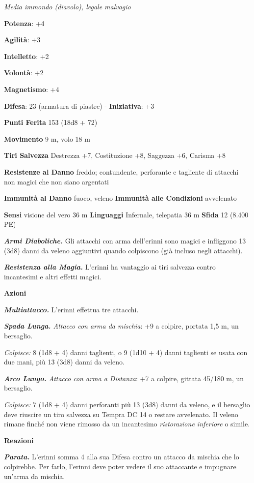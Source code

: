 \begin{multicols}{2}
\emph{Media immondo (diavolo), legale malvagio}

\textbf{Potenza}: +4

\textbf{Agilità}: +3

\textbf{Intelletto}: +2

\textbf{Volontà}: +2

\textbf{Magnetismo}: +4

\textbf{Difesa}: 23 (armatura di piastre) - \textbf{Iniziativa}: +3

\textbf{Punti Ferita} 153 (18d8 + 72)

\textbf{Movimento} 9 m, volo 18 m

\textbf{Tiri Salvezza} Destrezza +7, Costituzione +8, Saggezza +6,
Carisma +8

\textbf{Resistenze al Danno} freddo; contundente, perforante e tagliente
di attacchi non magici che non siano argentati

\textbf{Immunità al Danno} fuoco, veleno \textbf{Immunità alle
Condizioni} avvelenato

\textbf{Sensi} visione del vero 36 m
\textbf{Linguaggi} Infernale, telepatia 36 m \textbf{Sfida} 12 (8.400
PE)

\emph{\textbf{Armi Diaboliche.}} Gli attacchi con arma dell'erinni sono
magici e infliggono 13 (3d8) danni da veleno aggiuntivi quando
colpiscono (già incluso negli attacchi).

\emph{\textbf{Resistenza alla Magia.}} L'erinni ha vantaggio ai tiri
salvezza contro incantesimi e altri effetti magici.

\textbf{Azioni}

\emph{\textbf{Multiattacco.}} L'erinni effettua tre attacchi.

\emph{\textbf{Spada Lunga.} Attacco con arma da mischia}: +9 a colpire,
portata 1,5 m, un bersaglio.

\emph{Colpisce:} 8 (1d8 + 4) danni taglienti, o 9 (1d10 + 4) danni
taglienti se usata con due mani, più 13 (3d8) danni da veleno.

\emph{\textbf{Arco Lungo.} Attacco con arma a Distanza}: +7 a colpire,
gittata 45/180 m, un bersaglio.

\emph{Colpisce:} 7 (1d8 + 4) danni perforanti più 13 (3d8) danni da
veleno, e il bersaglio deve riuscire un tiro salvezza su Tempra DC
14 o restare avvelenato. Il veleno rimane finché non viene rimosso da un
incantesimo \emph{ristorazione inferiore} o simile.

\textbf{Reazioni}

\emph{\textbf{Parata.}} L'erinni somma 4 alla sua Difesa contro un attacco
da mischia che lo colpirebbe. Per farlo, l'erinni deve poter vedere il
suo attaccante e impugnare un'arma da mischia.




\end{multicols}
